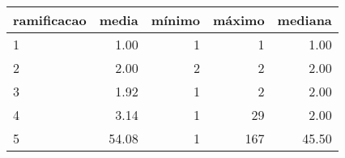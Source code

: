 \begin{table}[ht]
\centering
\begin{tabular}{lrrrr}
  \hline
ramificacao & media & mínimo & máximo & mediana \\ 
  \hline
1 & 1.00 &   1 &   1 & 1.00 \\ 
  2 & 2.00 &   2 &   2 & 2.00 \\ 
  3 & 1.92 &   1 &   2 & 2.00 \\ 
  4 & 3.14 &   1 &  29 & 2.00 \\ 
  5 & 54.08 &   1 & 167 & 45.50 \\ 
   \hline
\end{tabular}
\end{table}
